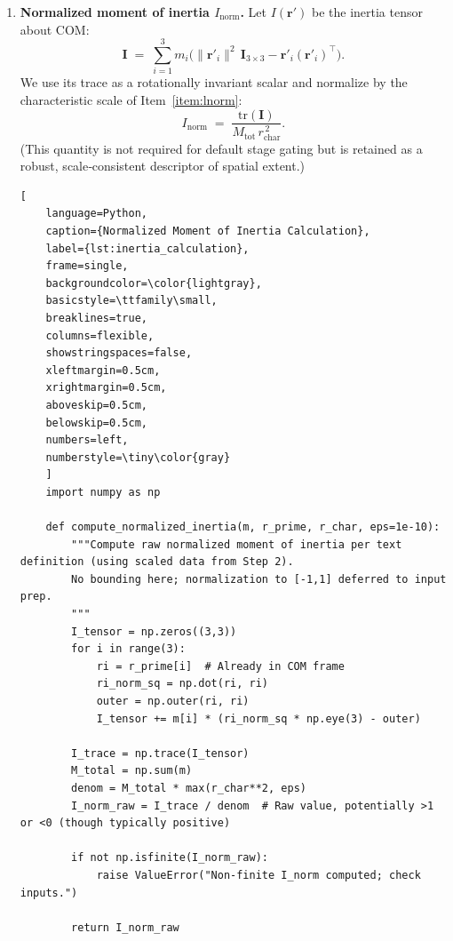 \begin{enumerate}
    \item \textbf{Normalized moment of inertia $I_{\mathrm{norm}}$.}
    \label{item:inorm}
    Let $I(\mathbf r')$ be the inertia tensor about COM:
    \begin{equation}
    \mathbf I \;=\; \sum_{i=1}^{3} m_i \Big( \lVert \mathbf r'_i \rVert^2 \,\mathbf I_{3\times 3}
                                        - \mathbf r'_i (\mathbf r'_i)^{\!\top} \Big).
    \end{equation}
    We use its trace as a rotationally invariant scalar and normalize by the characteristic
    scale of Item~\ref{item:lnorm}:
    \begin{equation}
    I_{\mathrm{norm}} \;=\; \frac{\mathrm{tr}(\mathbf I)}{M_{\mathrm{tot}}\, r_{\mathrm{char}}^{\,2}}.
    \end{equation}
    (This quantity is not required for default stage gating but is retained as a robust,
    scale‑consistent descriptor of spatial extent.)

    \begin{lstlisting}[
    language=Python,
    caption={Normalized Moment of Inertia Calculation},
    label={lst:inertia_calculation},
    frame=single,
    backgroundcolor=\color{lightgray},
    basicstyle=\ttfamily\small,
    breaklines=true,
    columns=flexible,
    showstringspaces=false,
    xleftmargin=0.5cm,
    xrightmargin=0.5cm,
    aboveskip=0.5cm,
    belowskip=0.5cm,
    numbers=left,
    numberstyle=\tiny\color{gray}
    ]
    import numpy as np

    def compute_normalized_inertia(m, r_prime, r_char, eps=1e-10):
        """Compute raw normalized moment of inertia per text definition (using scaled data from Step 2).
        No bounding here; normalization to [-1,1] deferred to input prep.
        """
        I_tensor = np.zeros((3,3))
        for i in range(3):
            ri = r_prime[i]  # Already in COM frame
            ri_norm_sq = np.dot(ri, ri)
            outer = np.outer(ri, ri)
            I_tensor += m[i] * (ri_norm_sq * np.eye(3) - outer)
        
        I_trace = np.trace(I_tensor)
        M_total = np.sum(m)
        denom = M_total * max(r_char**2, eps)
        I_norm_raw = I_trace / denom  # Raw value, potentially >1 or <0 (though typically positive)
        
        if not np.isfinite(I_norm_raw):
            raise ValueError("Non-finite I_norm computed; check inputs.")
        
        return I_norm_raw
    \end{lstlisting}


\end{enumerate}
